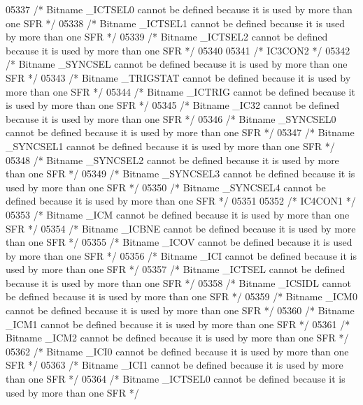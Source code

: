 \begin{DoxyCode}
05337 \textcolor{comment}{/* Bitname \_ICTSEL0 cannot be defined because it is used by more than one SFR */}
05338 \textcolor{comment}{/* Bitname \_ICTSEL1 cannot be defined because it is used by more than one SFR */}
05339 \textcolor{comment}{/* Bitname \_ICTSEL2 cannot be defined because it is used by more than one SFR */}
05340 
05341 \textcolor{comment}{/* IC3CON2 */}
05342 \textcolor{comment}{/* Bitname \_SYNCSEL cannot be defined because it is used by more than one SFR */}
05343 \textcolor{comment}{/* Bitname \_TRIGSTAT cannot be defined because it is used by more than one SFR */}
05344 \textcolor{comment}{/* Bitname \_ICTRIG cannot be defined because it is used by more than one SFR */}
05345 \textcolor{comment}{/* Bitname \_IC32 cannot be defined because it is used by more than one SFR */}
05346 \textcolor{comment}{/* Bitname \_SYNCSEL0 cannot be defined because it is used by more than one SFR */}
05347 \textcolor{comment}{/* Bitname \_SYNCSEL1 cannot be defined because it is used by more than one SFR */}
05348 \textcolor{comment}{/* Bitname \_SYNCSEL2 cannot be defined because it is used by more than one SFR */}
05349 \textcolor{comment}{/* Bitname \_SYNCSEL3 cannot be defined because it is used by more than one SFR */}
05350 \textcolor{comment}{/* Bitname \_SYNCSEL4 cannot be defined because it is used by more than one SFR */}
05351 
05352 \textcolor{comment}{/* IC4CON1 */}
05353 \textcolor{comment}{/* Bitname \_ICM cannot be defined because it is used by more than one SFR */}
05354 \textcolor{comment}{/* Bitname \_ICBNE cannot be defined because it is used by more than one SFR */}
05355 \textcolor{comment}{/* Bitname \_ICOV cannot be defined because it is used by more than one SFR */}
05356 \textcolor{comment}{/* Bitname \_ICI cannot be defined because it is used by more than one SFR */}
05357 \textcolor{comment}{/* Bitname \_ICTSEL cannot be defined because it is used by more than one SFR */}
05358 \textcolor{comment}{/* Bitname \_ICSIDL cannot be defined because it is used by more than one SFR */}
05359 \textcolor{comment}{/* Bitname \_ICM0 cannot be defined because it is used by more than one SFR */}
05360 \textcolor{comment}{/* Bitname \_ICM1 cannot be defined because it is used by more than one SFR */}
05361 \textcolor{comment}{/* Bitname \_ICM2 cannot be defined because it is used by more than one SFR */}
05362 \textcolor{comment}{/* Bitname \_ICI0 cannot be defined because it is used by more than one SFR */}
05363 \textcolor{comment}{/* Bitname \_ICI1 cannot be defined because it is used by more than one SFR */}
05364 \textcolor{comment}{/* Bitname \_ICTSEL0 cannot be defined because it is used by more than one SFR */}

\end{DoxyCode}
